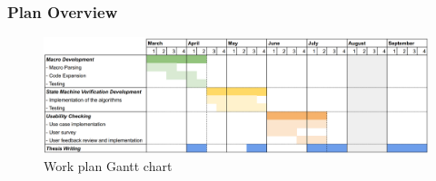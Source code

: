 \documentclass[bigger,notes,aspectratio=169]{beamer}
\begin{document}
\begin{frame}
    \frametitle{Plan Overview}

    \begin{figure}[h]
        \centering
        \includegraphics[width=\linewidth]{planning.png}
        \caption{Work plan Gantt chart}
    \end{figure}

\end{frame}
\end{document}
